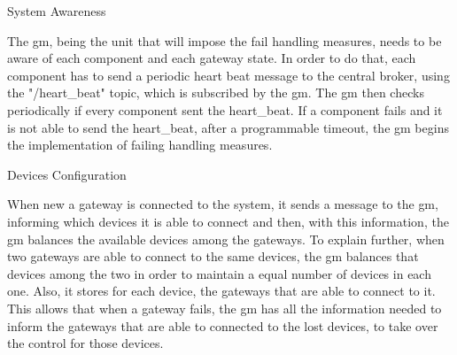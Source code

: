 \begin{Paragraph}{System Awareness}

The \ac{gm}, being the unit that will impose the fail handling measures, needs to be aware of each component and each gateway state. In order to do that, each component has to send a periodic heart beat message to the central broker, using the "/heart\_beat" topic, which is subscribed by the \ac{gm}. The \ac{gm} then checks periodically if every component sent the heart\_beat. If a component fails and it is not able to send the heart\_beat, after a programmable timeout, the \ac{gm} begins the implementation of failing handling measures.

\end{Paragraph}

\begin{Paragraph}{Devices Configuration}

When new a gateway is connected to the system, it sends a message to the \ac{gm}, informing which devices it is able to connect and then, with this information, the \ac{gm} balances the available devices among the gateways. To explain further, when two gateways are able to connect to the same devices, the \ac{gm} balances that devices among the two in order to maintain a equal number of devices in each one. Also, it stores for each device, the gateways that are able to connect to it. This allows that when a gateway fails, the \ac{gm} has all the information needed to inform the gateways that are able to connected to the lost devices, to take over the control for those devices.

\end{Paragraph}


